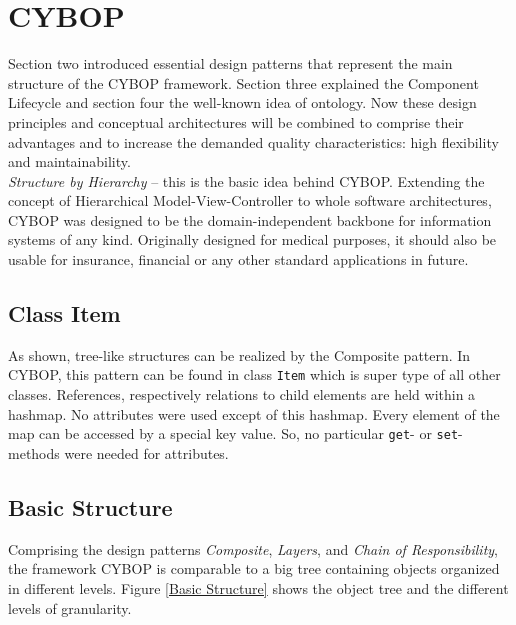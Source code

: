 \section{CYBOP}
Section two introduced essential design patterns that represent
the main structure of the CYBOP framework. Section three explained the
Component Lifecycle and section four the well-known idea of ontology.
Now these design principles and conceptual architectures will be combined
to comprise their advantages and to increase the demanded quality characteristics:
high flexibility and maintainability.\\
\emph{Structure by Hierarchy} -- this is the basic idea behind CYBOP.
Extending the concept of Hierarchical Model-View-Controller to whole
software architectures, CYBOP was designed to be the domain-independent
backbone for information systems of any kind. Originally designed for
medical purposes, it should also be usable for insurance, financial or any
other standard applications in future.

\subsection{Class Item}
As shown, tree-like structures can be realized by the Composite pattern.
In CYBOP, this pattern can be found in class {\tt Item} which is super type
of all other classes. References, respectively relations to child elements
are held within a hashmap. No attributes were used except of this hashmap.
Every element of the map can be accessed by a special key value. So, no
particular {\tt get}- or {\tt set}-methods were needed for attributes.

\subsection{Basic Structure}
Comprising the design patterns \emph{Composite}, \emph{Layers}, and
\emph{Chain of Responsibility}, the framework CYBOP is comparable to a big
tree containing objects organized in different levels. Figure \ref{Basic Structure}
shows the object tree and the different levels of granularity.
